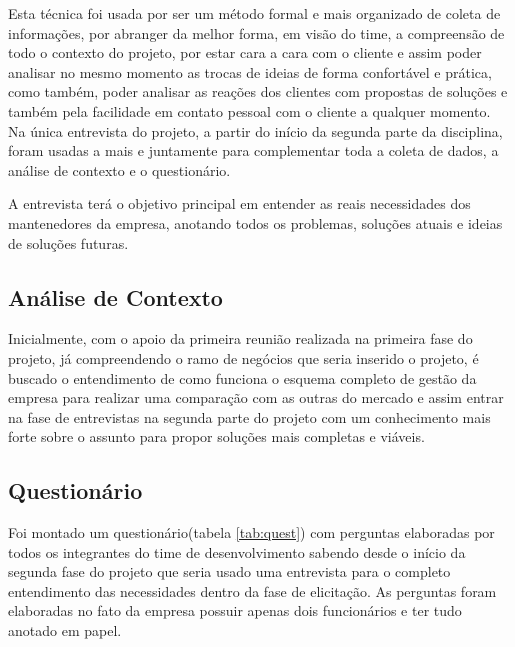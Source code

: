 Esta técnica foi usada por ser um método formal e mais organizado de coleta de informações,  por abranger da melhor forma, em visão do time, a compreensão de todo o contexto do projeto, por estar cara a cara com o cliente e assim poder analisar no mesmo momento as trocas de ideias de forma confortável e prática, como também, poder analisar as reações dos clientes com propostas de soluções e também pela facilidade em contato pessoal com o cliente a qualquer momento. Na única entrevista do projeto, a partir do início da segunda parte da disciplina, foram usadas a mais e juntamente para complementar toda a coleta de dados, a análise de contexto e o questionário.

A entrevista terá o objetivo principal em entender as reais necessidades dos mantenedores da empresa, anotando todos os problemas, soluções atuais e ideias de soluções futuras.

\subsection{Análise de Contexto}

Inicialmente, com o apoio da primeira reunião realizada na primeira fase do projeto, já compreendendo o ramo de negócios que seria inserido o projeto, é buscado o entendimento de como funciona o esquema completo de gestão da empresa para realizar uma comparação com as outras do mercado e assim entrar na fase de entrevistas na segunda parte do projeto com um conhecimento mais forte sobre o assunto para propor soluções mais completas e viáveis.

\subsection{Questionário}

Foi montado um questionário(tabela \ref{tab:quest}) com perguntas elaboradas por todos os integrantes do time de desenvolvimento sabendo desde o início da segunda fase do projeto que seria usado uma entrevista para o completo entendimento das necessidades dentro da fase de elicitação. As perguntas foram elaboradas no fato da empresa possuir apenas dois funcionários e ter tudo anotado em papel.

